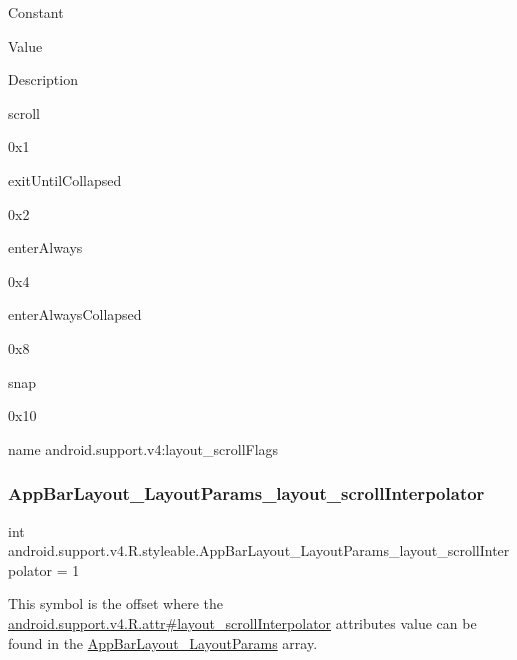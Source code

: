 Constant

Value

Description 

{\ttfamily scroll}

0x1

{\ttfamily exit\+Until\+Collapsed}

0x2

{\ttfamily enter\+Always}

0x4

{\ttfamily enter\+Always\+Collapsed}

0x8

{\ttfamily snap}

0x10

name android.\+support.\+v4\+:layout\+\_\+scroll\+Flags \mbox{\label{classandroid_1_1support_1_1v4_1_1R_1_1styleable_a97ee4a175966cfa75d14a9d739d0b0fd}} 
\subsubsection{\texorpdfstring{App\+Bar\+Layout\+\_\+\+Layout\+Params\+\_\+layout\+\_\+scroll\+Interpolator}{AppBarLayout\_LayoutParams\_layout\_scrollInterpolator}}
{\footnotesize\ttfamily int android.\+support.\+v4.\+R.\+styleable.\+App\+Bar\+Layout\+\_\+\+Layout\+Params\+\_\+layout\+\_\+scroll\+Interpolator = 1\hspace{0.3cm}{\ttfamily [static]}}

This symbol is the offset where the \hyperlink{classandroid_1_1support_1_1v4_1_1R_1_1attr_a879822f9c1ac12993c96e025796ef13d}{android.\+support.\+v4.\+R.\+attr\#layout\+\_\+scroll\+Interpolator} attribute\textquotesingle{}s value can be found in the \hyperlink{classandroid_1_1support_1_1v4_1_1R_1_1styleable_a08b2a4151f7d2667720f413dc2243694}{App\+Bar\+Layout\+\_\+\+Layout\+Params} array.

